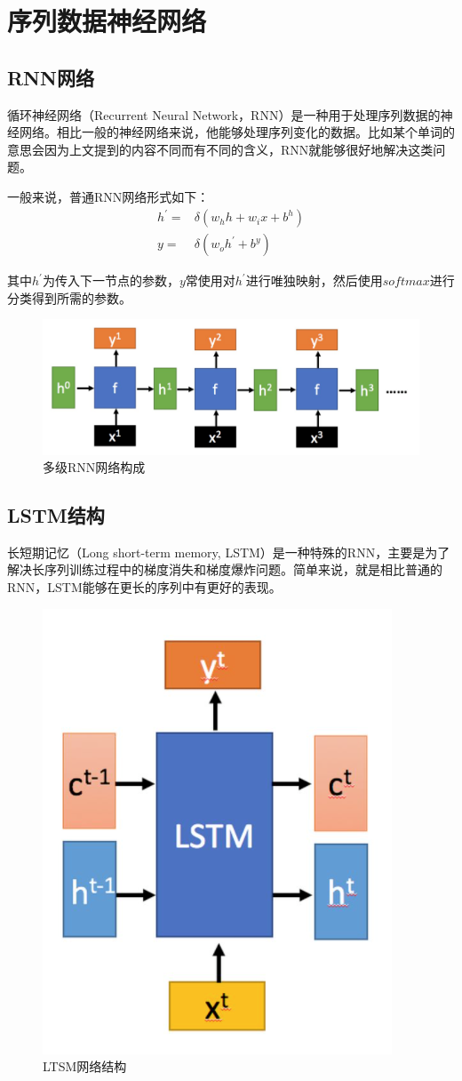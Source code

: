\documentclass{jnuthesis}
\begin{document}
\section{序列数据神经网络}

\subsection{RNN网络}
循环神经网络（Recurrent Neural Network，RNN）是一种用于处理序列数据的神经网络。相比一般的神经网络来说，他能够处理序列变化的数据。比如某个单词的意思会因为上文提到的内容不同而有不同的含义，RNN就能够很好地解决这类问题。

一般来说，普通RNN网络形式如下：
\begin{align}
	h^{\prime}=&\delta(w_h h+w_i x+b^{h})\\
	 y=&\delta( w_o h^{\prime}+b^{y})
\end{align}


其中$ h^{\prime} $为传入下一节点的参数，$ y $常使用对$ h^{\prime} $进行唯独映射，然后使用$ softmax $进行分类得到所需的参数。


\begin{figure}[H]
	\centering
	\includegraphics[width=\linewidth]{pic/screenshot001}
	\caption{多级RNN网络构成}
	\label{fig:screenshot001}
\end{figure}

\subsection{LSTM结构}

长短期记忆（Long short-term memory, LSTM）是一种特殊的RNN，主要是为了解决长序列训练过程中的梯度消失和梯度爆炸问题。简单来说，就是相比普通的RNN，LSTM能够在更长的序列中有更好的表现。

\begin{figure}[H]
	\centering
	\includegraphics[width=0.3\linewidth]{pic/screenshot002}
	\caption{LTSM网络结构}
	\label{fig:screenshot002}
\end{figure}
\end{document}
